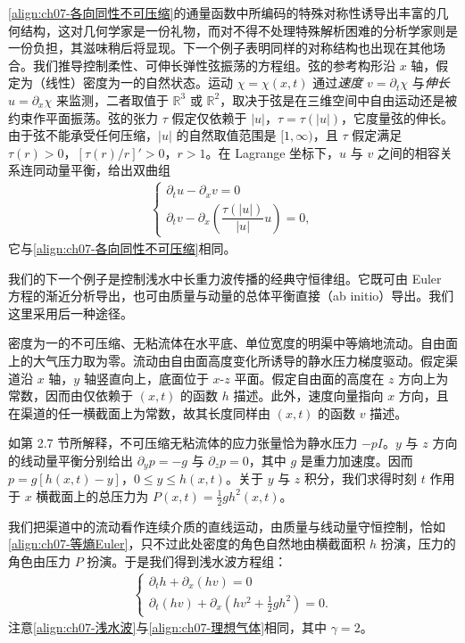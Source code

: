 \documentclass[../../main.tex]{subfiles}
\begin{document}
\eqref{align:ch07-各向同性不可压缩}的通量函数中所编码的特殊对称性诱导出丰富的几何结构，这对几何学家是一份礼物，而对不得不处理特殊解析困难的分析学家则是一份负担，其滋味稍后将显现。下一个例子表明同样的对称结构也出现在其他场合。我们推导控制柔性、可伸长弹性弦振荡的方程组。弦的参考构形沿 $x$ 轴，假定为（线性）密度为一的自然状态。运动 $\chi=\chi(x,t)$ 通过\emph{速度} $v=\partial_t\chi$ 与\emph{伸长} $u=\partial_x\chi$ 来监测，二者取值于 $\mathbb{R}^3$ 或 $\mathbb{R}^2$，取决于弦是在三维空间中自由运动还是被约束作平面振荡。弦的张力 $\tau$ 假定仅依赖于 $|u|$，$\tau=\tau(|u|)$，它度量弦的伸长。由于弦不能承受任何压缩，$|u|$ 的自然取值范围是 $[1,\infty)$，且 $\tau$ 假定满足 $\tau(r)>0$，$[\tau(r)/r]'>0$，$r>1$。在 Lagrange 坐标下，$u$ 与 $v$ 之间的相容关系连同动量平衡，给出双曲组
\begin{align}
\begin{cases}
\partial_t u-\partial_x v=0\\
\partial_t v-\partial_x\left(\dfrac{\tau(|u|)}{|u|}u\right)=0,
\end{cases}
\label{align:ch07-弹性弦}
\end{align}
它与\eqref{align:ch07-各向同性不可压缩}相同。

我们的下一个例子是控制浅水中长重力波传播的经典守恒律组。它既可由 Euler 方程的渐近分析导出，也可由质量与动量的总体平衡直接（ab initio）导出。我们这里采用后一种途径。

密度为一的不可压缩、无粘流体在水平底、单位宽度的明渠中等熵地流动。自由面上的大气压力取为零。流动由自由面高度变化所诱导的静水压力梯度驱动。假定渠道沿 $x$ 轴，$y$ 轴竖直向上，底面位于 $x$-$z$ 平面。假定自由面的高度在 $z$ 方向上为常数，因而由仅依赖于 $(x,t)$ 的函数 $h$ 描述。此外，速度向量指向 $x$ 方向，且在渠道的任一横截面上为常数，故其长度同样由 $(x,t)$ 的函数 $v$ 描述。

如第 2.7 节所解释，不可压缩无粘流体的应力张量恰为静水压力 $-pI$。$y$ 与 $z$ 方向的线动量平衡分别给出 $\partial_y p=-g$ 与 $\partial_z p=0$，其中 $g$ 是重力加速度。因而 $p=g[h(x,t)-y]$，$0\leqslant y\leqslant h(x,t)$。关于 $y$ 与 $z$ 积分，我们求得时刻 $t$ 作用于 $x$ 横截面上的总压力为 $P(x,t)=\frac12 gh^2(x,t)$。

我们把渠道中的流动看作连续介质的直线运动，由质量与线动量守恒控制，恰如\eqref{align:ch07-等熵Euler}，只不过此处密度的角色自然地由横截面积 $h$ 扮演，压力的角色由压力 $P$ 扮演。于是我们得到浅水波方程组：
\begin{align}
\begin{cases}
\partial_t h+\partial_x(hv)=0\\
\partial_t(hv)+\partial_x\left(hv^2+\tfrac12 gh^2\right)=0.
\end{cases}
\label{align:ch07-浅水波}
\end{align}
注意\eqref{align:ch07-浅水波}与\eqref{align:ch07-理想气体}相同，其中 $\gamma=2$。
\end{document}
